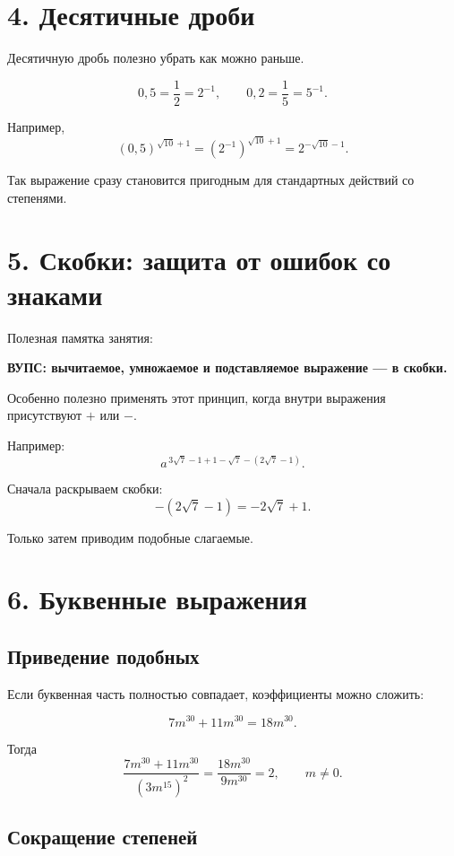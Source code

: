 \documentclass[a4paper,12pt]{article}
\newcommand{\important}[1]{\textcolor{darkaccent}{\textbf{#1}}}
\begin{document}
\section{4. Десятичные дроби}

Десятичную дробь полезно убрать как можно раньше.

\[
0{,}5=\frac12=2^{-1},
\qquad
0{,}2=\frac15=5^{-1}.
\]

Например,
\[
(0{,}5)^{\sqrt{10}+1}
=
\left(2^{-1}\right)^{\sqrt{10}+1}
=
2^{-\sqrt{10}-1}.
\]

Так выражение сразу становится пригодным для стандартных действий со степенями.

\section{5. Скобки: защита от ошибок со знаками}

Полезная памятка занятия:

\begin{center}
\important{ВУПС: вычитаемое, умножаемое и подставляемое выражение --- в скобки.}
\end{center}

Особенно полезно применять этот принцип, когда внутри выражения присутствуют \(+\) или \(-\).

Например:
\[
a^{\,3\sqrt7-1+1-\sqrt7-(2\sqrt7-1)}.
\]

Сначала раскрываем скобки:
\[
-(2\sqrt7-1)=-2\sqrt7+1.
\]

Только затем приводим подобные слагаемые.

\section{6. Буквенные выражения}

\subsection{Приведение подобных}

Если буквенная часть полностью совпадает, коэффициенты можно сложить:

\[
7m^{30}+11m^{30}
=
18m^{30}.
\]

Тогда
\[
\frac{7m^{30}+11m^{30}}{(3m^{15})^2}
=
\frac{18m^{30}}{9m^{30}}
=
2,
\qquad m\neq0.
\]

\subsection{Сокращение степеней}
\end{document}
